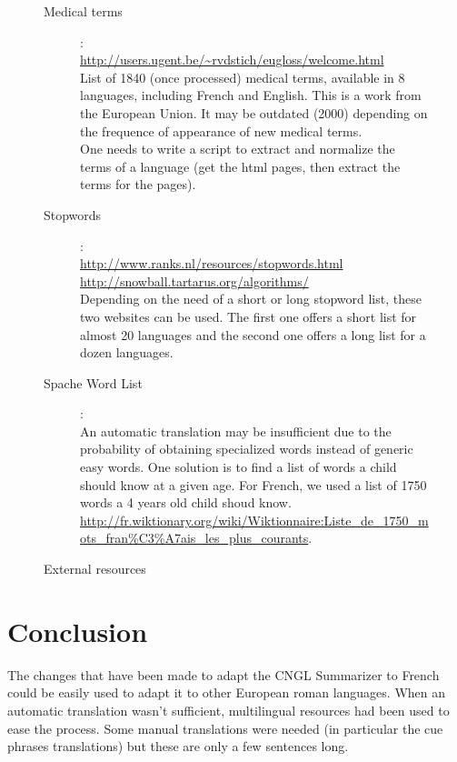 \documentclass[a4paper,10pt]{article}
\begin{document}
\begin{figure}[H]
  \centering
  \begin{description}
  \item[Medical terms] : \hfill \\
    \url{http://users.ugent.be/~rvdstich/eugloss/welcome.html}\\
    List of 1840 (once processed) medical terms, available in 8
    languages, including French and English. This is a work from the
    European Union. It may be outdated (2000) depending on the
    frequence of appearance of new medical terms.\\
    One needs to write a script to extract and normalize the terms of a
    language (get the html pages, then extract the terms for the
    pages).
  \item[Stopwords] : \hfill \\
    \url{http://www.ranks.nl/resources/stopwords.html}\\
    \url{http://snowball.tartarus.org/algorithms/}\\
    Depending on the need of a short or long stopword list, these two
    websites can be used. The first one offers a short list for
    almost 20 languages and the second one offers a long list for a
    dozen languages.
  \item[Spache Word List] : \hfill \\
    An automatic translation may be insufficient due to the probability
    of obtaining specialized words instead of generic easy words. One
    solution is to find a list of words a child should know at a given
    age. For French, we used a list of 1750 words a 4 years old child
    shoud know.\\
    \url{http://fr.wiktionary.org/wiki/Wiktionnaire:Liste_de_1750_mots_fran%C3%A7ais_les_plus_courants}.
      
  \end{description}
  
  \caption{External resources}
  \label{fig:extres}
\end{figure}

\section{Conclusion}
\label{sec:conclusion}

The changes that have been made to adapt the CNGL Summarizer to French
could be easily used to adapt it to other European roman
languages. When an automatic translation wasn't sufficient,
multilingual resources had been used to ease the process. Some manual
translations were needed (in particular the cue phrases translations)
but these are only a few sentences long.
\end{document}

